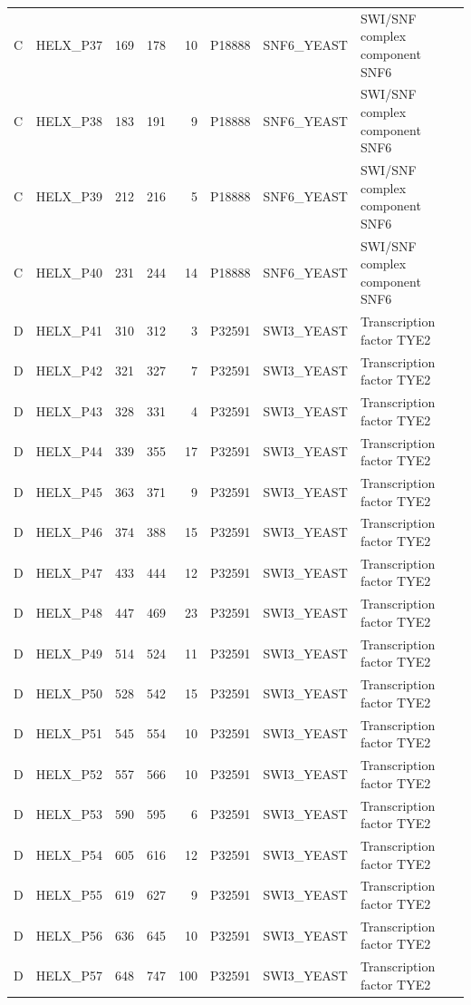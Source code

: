 \begin{longtable}{@{}llrrrrllp{5.2cm}@{}}
  C & HELX_P37 & 169 & 178 & 10 & P18888 & SNF6_YEAST & SWI/SNF complex component SNF6 \\
  C & HELX_P38 & 183 & 191 & 9 & P18888 & SNF6_YEAST & SWI/SNF complex component SNF6 \\
  C & HELX_P39 & 212 & 216 & 5 & P18888 & SNF6_YEAST & SWI/SNF complex component SNF6 \\
  C & HELX_P40 & 231 & 244 & 14 & P18888 & SNF6_YEAST & SWI/SNF complex component SNF6 \\
  D & HELX_P41 & 310 & 312 & 3 & P32591 & SWI3_YEAST & Transcription factor TYE2 \\
  D & HELX_P42 & 321 & 327 & 7 & P32591 & SWI3_YEAST & Transcription factor TYE2 \\
  D & HELX_P43 & 328 & 331 & 4 & P32591 & SWI3_YEAST & Transcription factor TYE2 \\
  D & HELX_P44 & 339 & 355 & 17 & P32591 & SWI3_YEAST & Transcription factor TYE2 \\
  D & HELX_P45 & 363 & 371 & 9 & P32591 & SWI3_YEAST & Transcription factor TYE2 \\
  D & HELX_P46 & 374 & 388 & 15 & P32591 & SWI3_YEAST & Transcription factor TYE2 \\
  D & HELX_P47 & 433 & 444 & 12 & P32591 & SWI3_YEAST & Transcription factor TYE2 \\
  D & HELX_P48 & 447 & 469 & 23 & P32591 & SWI3_YEAST & Transcription factor TYE2 \\
  D & HELX_P49 & 514 & 524 & 11 & P32591 & SWI3_YEAST & Transcription factor TYE2 \\
  D & HELX_P50 & 528 & 542 & 15 & P32591 & SWI3_YEAST & Transcription factor TYE2 \\
  D & HELX_P51 & 545 & 554 & 10 & P32591 & SWI3_YEAST & Transcription factor TYE2 \\
  D & HELX_P52 & 557 & 566 & 10 & P32591 & SWI3_YEAST & Transcription factor TYE2 \\
  D & HELX_P53 & 590 & 595 & 6 & P32591 & SWI3_YEAST & Transcription factor TYE2 \\
  D & HELX_P54 & 605 & 616 & 12 & P32591 & SWI3_YEAST & Transcription factor TYE2 \\
  D & HELX_P55 & 619 & 627 & 9 & P32591 & SWI3_YEAST & Transcription factor TYE2 \\
  D & HELX_P56 & 636 & 645 & 10 & P32591 & SWI3_YEAST & Transcription factor TYE2 \\
  D & HELX_P57 & 648 & 747 & 100 & P32591 & SWI3_YEAST & Transcription factor TYE2 \\

\end{longtable}
